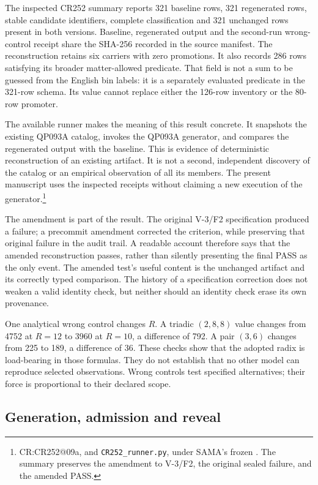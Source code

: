 The inspected CR252 summary reports 321 baseline rows, 321 regenerated rows, stable candidate identifiers, complete classification and 321 unchanged rows present in both versions. Baseline, regenerated output and the second-run wrong-control receipt share the SHA-256 recorded in the source manifest. The reconstruction retains six carriers with zero promotions. It also records 286 rows satisfying its broader matter-allowed predicate. That field is not a sum to be guessed from the English bin labels: it is a separately evaluated predicate in the 321-row schema. Its value cannot replace either the 126-row inventory or the 80-row promoter.

The available runner makes the meaning of this result concrete. It snapshots the existing QP093A catalog, invokes the QP093A generator, and compares the regenerated output with the baseline. This is evidence of deterministic reconstruction of an existing artifact. It is not a second, independent discovery of the catalog or an empirical observation of all its members. The present manuscript uses the inspected receipts without claiming a new execution of the generator.\footnote{CR:CR252@09a,  and \texttt{CR252\_runner.py}, under SAMA's frozen . The summary preserves the amendment to V-3/F2, the original sealed failure, and the amended PASS.}

\cite{viicr252} The amendment is part of the result. The original V-3/F2 specification produced a failure; a precommit amendment corrected the criterion, while preserving that original failure in the audit trail. A readable account therefore says that the amended reconstruction passes, rather than silently presenting the final PASS as the only event. The amended test's useful content is the unchanged artifact and its correctly typed comparison. The history of a specification correction does not weaken a valid identity check, but neither should an identity check erase its own provenance.

One analytical wrong control changes $R$. A triadic $(2,8,8)$ value changes from 4752 at $R=12$ to 3960 at $R=10$, a difference of 792. A pair $(3,6)$ changes from 225 to 189, a difference of 36. These checks show that the adopted radix is load-bearing in those formulas. They do not establish that no other model can reproduce selected observations. Wrong controls test specified alternatives; their force is proportional to their declared scope.

\subsection{Generation, admission and reveal}

